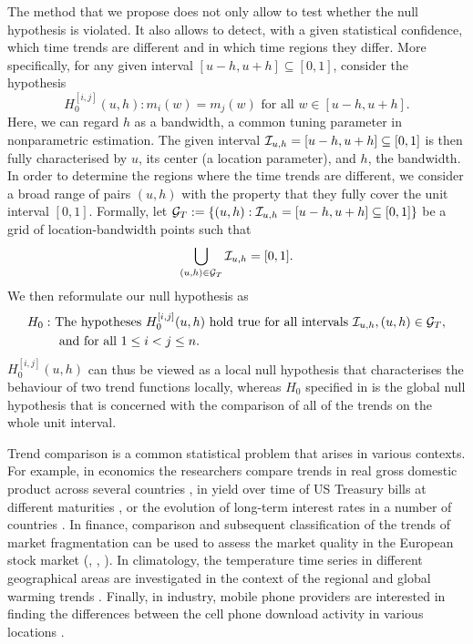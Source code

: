 \documentclass[a4paper,12pt]{article}
\makeatletter
\renewcommand{\eqref}[1]{\tagform@{\ref{#1}}}
\makeatother
\begin{document}
The method that we propose does not only allow to test whether the null hypothesis is violated. It also allows to detect, with a given statistical confidence, which time trends are different and in which time regions they differ. More specifically, for any given interval $[u-h, u+h] \subseteq [0,1]$, consider the hypothesis
\[ H_0^{[i, j]}(u, h): m_i(w) = m_j(w) \text{ for all } w \in [u-h, u+h]. \] 
Here, we can regard $h$ as a bandwidth, a common tuning parameter in nonparametric estimation. The given interval $\mathcal{I}_{u, h} = [u-h, u+h] \subseteq [0,1]$ is then fully characterised by $u$, its center (a location parameter), and $h$, the bandwidth. In order to determine the regions where the time trends are different, we consider a broad range of pairs $(u, h)$ with the property that they fully cover the unit interval $[0, 1]$. Formally, let \linebreak $\mathcal{G}_T := \{(u, h): \mathcal{I}_{u, h} = [u-h, u+h] \subseteq [0,1]\}$ be a grid of location-bandwidth points such that 
\begin{align*}
\bigcup_{(u, h) \in \mathcal{G}_T}  \mathcal{I}_{u, h} = [0,1].
\end{align*}
We then reformulate our null hypothesis \eqref{eq:null} as
\begin{align*}
H_0: \ & \text{The hypotheses } H_0^{[i, j]}(u, h) \text{ hold true for all intervals }  \mathcal{I}_{u, h}, (u, h) \in \mathcal{G}_T, \\ & \text{ and for all } 1 \le i < j \le n. 
\end{align*} 
$H_0^{[i, j]}(u, h)$ can thus be viewed as a local null hypothesis that characterises the behaviour of two trend functions locally, whereas $H_0$ specified in \eqref{eq:null} is the global null hypothesis that is concerned with the comparison of all of the trends on the whole unit interval.

Trend comparison is a common statistical problem that arises in various contexts. For example, in economics the researchers compare trends in real gross domestic product across several countries \citep[][]{Grier1989}, in yield over time of US Treasury bills at different maturities \citep[][]{Park2009}, or the evolution of long-term interest rates in a number of countries \citep[][]{Christiansen1997}. In finance, comparison and subsequent classification of the trends of market fragmentation can be used to assess the market quality in the European stock market (\citeauthor{VogtLinton2017}, \citeyear{VogtLinton2017}, \citeyear{VogtLinton2020}). In climatology, the temperature time series in different geographical areas are investigated in the context of the regional and global warming trends \citep[][]{KarolyWu2005}. Finally, in industry, mobile phone providers are interested in finding the differences between the cell phone download activity in various locations \citep[][]{DegrasWu2012}.
\end{document}
